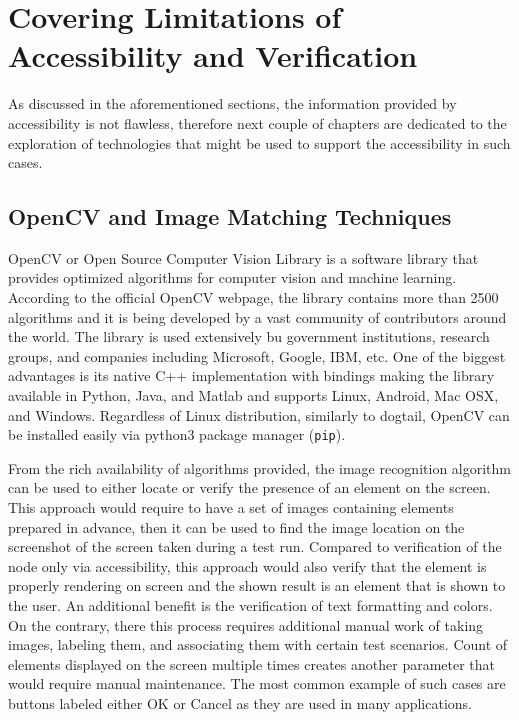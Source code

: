\section{Covering Limitations of Accessibility and Verification}
As discussed in the aforementioned sections, the information provided by accessibility is not flawless, therefore next couple of chapters are dedicated to the exploration of technologies that might be used to support the accessibility in such cases.

\subsection{OpenCV and Image Matching Techniques}
OpenCV or Open Source Computer Vision Library is a software library that provides optimized algorithms for computer vision and machine learning. According to the official OpenCV webpage\cite{opencv}, the library contains more than 2500 algorithms and it is being developed 
by a vast community of contributors around the world. The library is used extensively bu government institutions, research groups, and companies including Microsoft, Google, IBM, etc. One of the biggest advantages is its native C++ implementation with bindings making the library available in Python, Java, and Matlab and supports Linux, Android, Mac OSX, and Windows. Regardless of Linux distribution, similarly to dogtail, OpenCV can be installed easily via python3 package manager (\texttt{pip}). 

From the rich availability of algorithms provided, the image recognition algorithm can be used to either locate or verify the presence of an element on the screen. This approach would require to have a set of images containing elements prepared in advance, then it can be used to find the image location on the screenshot of the screen taken during a test run. Compared to verification of the node only via accessibility, this approach would also verify that the element is properly rendering on screen and the shown result is an element that is shown to the user. An additional benefit is the verification of text formatting and colors. On the contrary, there this process requires additional manual work of taking images, labeling them, and associating them with certain test scenarios. Count of elements displayed on the screen multiple times creates another parameter that would require manual maintenance. The most common example of such cases are buttons labeled either OK or Cancel as they are used in many applications.

